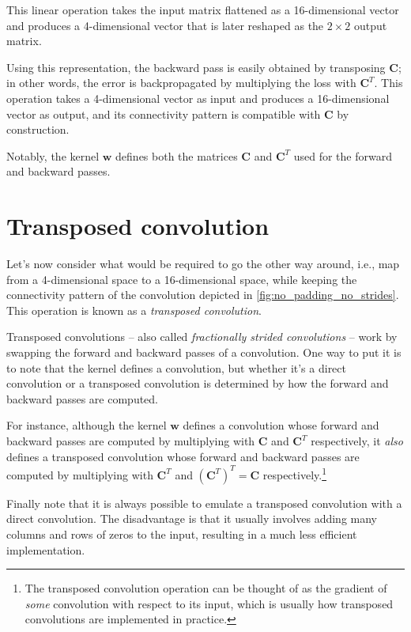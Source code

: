 \documentclass[notitlepage]{report}
\begin{document}
This linear operation takes the input matrix flattened as a 16-dimensional
vector and produces a 4-dimensional vector that is later reshaped as the $2
\times 2$ output matrix.

Using this representation, the backward pass is easily obtained by transposing
$\mathbf{C}$; in other words, the error is backpropagated by multiplying the
loss with $\mathbf{C}^T$. This operation takes a 4-dimensional vector as input
and produces a 16-dimensional vector as output, and its connectivity pattern is
compatible with $\mathbf{C}$ by construction.

Notably, the kernel $\mathbf{w}$ defines both the matrices $\mathbf{C}$ and
$\mathbf{C}^T$ used for the forward and backward passes.

\section{Transposed convolution}

Let's now consider what would be required to go the other way around, i.e., map
from a 4-dimensional space to a 16-dimensional space, while keeping the
connectivity pattern of the convolution depicted in
\autoref{fig:no_padding_no_strides}. This operation is known as a {\em
transposed convolution}.

Transposed convolutions -- also called {\em fractionally strided convolutions\/}
-- work by swapping the forward and backward passes of a convolution. One way to
put it is to note that the kernel defines a convolution, but whether it's a
direct convolution or a transposed convolution is determined by how the forward
and backward passes are computed.

For instance, although the kernel $\mathbf{w}$ defines a convolution whose
forward and backward passes are computed by multiplying with $\mathbf{C}$ and
$\mathbf{C}^T$ respectively, it {\em also\/} defines a transposed convolution
whose forward and backward passes are computed by multiplying with
$\mathbf{C}^T$ and $(\mathbf{C}^T)^T = \mathbf{C}$ respectively.\footnote{The
    transposed convolution operation can be thought of as the gradient of {\em
    some\/} convolution with respect to its input, which is usually how
    transposed convolutions are implemented in practice.}

Finally note that it is always possible to emulate a transposed convolution with
a direct convolution. The disadvantage is that it usually involves adding many
columns and rows of zeros to the input, resulting in a much less efficient
implementation.
\end{document}
